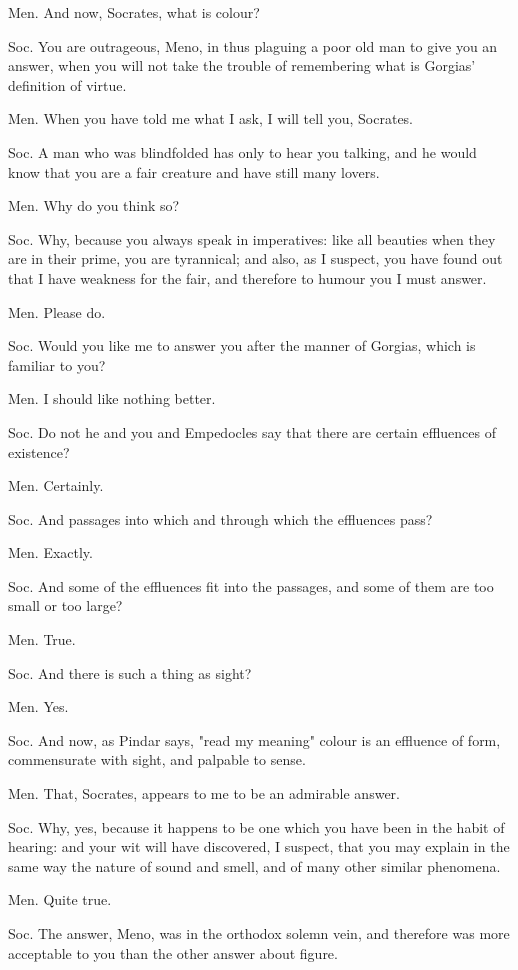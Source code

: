 Men. And now, Socrates, what is colour? 

Soc. You are outrageous, Meno, in thus plaguing a poor old man to
give you an answer, when you will not take the trouble of remembering
what is Gorgias' definition of virtue. 

Men. When you have told me what I ask, I will tell you, Socrates.

Soc. A man who was blindfolded has only to hear you talking, and he
would know that you are a fair creature and have still many lovers.

Men. Why do you think so? 

Soc. Why, because you always speak in imperatives: like all beauties
when they are in their prime, you are tyrannical; and also, as I suspect,
you have found out that I have weakness for the fair, and therefore
to humour you I must answer. 

Men. Please do. 

Soc. Would you like me to answer you after the manner of Gorgias,
which is familiar to you? 

Men. I should like nothing better. 

Soc. Do not he and you and Empedocles say that there are certain effluences
of existence? 

Men. Certainly. 

Soc. And passages into which and through which the effluences pass?

Men. Exactly. 

Soc. And some of the effluences fit into the passages, and some of
them are too small or too large? 

Men. True. 

Soc. And there is such a thing as sight? 

Men. Yes. 

Soc. And now, as Pindar says, "read my meaning" colour is an effluence
of form, commensurate with sight, and palpable to sense.

Men. That, Socrates, appears to me to be an admirable answer.

Soc. Why, yes, because it happens to be one which you have been in
the habit of hearing: and your wit will have discovered, I suspect,
that you may explain in the same way the nature of sound and smell,
and of many other similar phenomena. 

Men. Quite true. 

Soc. The answer, Meno, was in the orthodox solemn vein, and therefore
was more acceptable to you than the other answer about figure.

